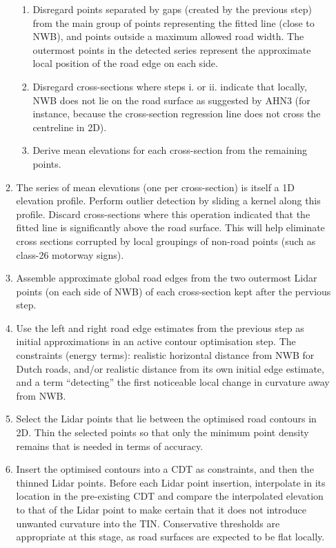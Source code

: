\begin{enumerate}
\begin{enumerate}
\begin{enumerate}
                \item Disregard points separated by gaps (created by the previous step) from the main group of points representing the fitted line (close to NWB), and points outside a maximum allowed road width. The outermost points in the detected series represent the approximate local position of the road edge on each side.
                \item Disregard cross-sections where steps i. or ii. indicate that locally, NWB does not lie on the road surface as suggested by AHN3 (for instance, because the cross-section regression line does not cross the centreline in 2D).
                \item Derive mean elevations for each cross-section from the remaining points.
            \end{enumerate}
            \item The series of mean elevations (one per cross-section) is itself a 1D elevation profile. Perform outlier detection by sliding a kernel along this profile. Discard cross-sections where this operation indicated that the fitted line is significantly above the road surface. This will help eliminate cross sections corrupted by local groupings of non-road points (such as class-26 motorway signs).
            \item Assemble approximate global road edges from the two outermost Lidar points (on each side of NWB) of each cross-section kept after the pervious step.
            \item Use the left and right road edge estimates from the previous step as initial approximations in an active contour optimisation step. The constraints (energy terms): realistic horizontal distance from NWB for Dutch roads, and/or realistic distance from its own initial edge estimate, and a term “detecting” the first noticeable local change in curvature away from NWB.
            \item Select the Lidar points that lie between the optimised road contours in 2D. Thin the selected points so that only the minimum point density remains that is needed in terms of accuracy.
            \item Insert the optimised contours into a CDT as constraints, and then the thinned Lidar points. Before each Lidar point insertion, interpolate in its location in the pre-existing CDT and compare the interpolated elevation to that of the Lidar point to make certain that it does not introduce unwanted curvature into the TIN. Conservative thresholds are appropriate at this stage, as road surfaces are expected to be flat locally.

\end{enumerate}
\end{enumerate}
